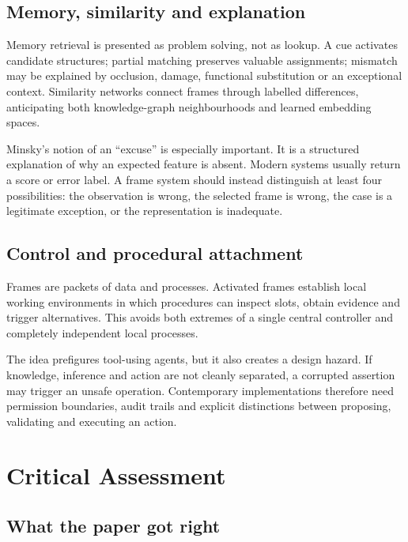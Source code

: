 \documentclass[11pt,a4paper]{article}
\begin{document}
\subsection{Memory, similarity and explanation}

Memory retrieval is presented as problem solving, not as lookup. A cue activates
candidate structures; partial matching preserves valuable assignments; mismatch
may be explained by occlusion, damage, functional substitution or an exceptional
context. Similarity networks connect frames through labelled differences,
anticipating both knowledge-graph neighbourhoods and learned embedding spaces.

Minsky's notion of an ``excuse'' is especially important. It is a structured
explanation of why an expected feature is absent. Modern systems usually return
a score or error label. A frame system should instead distinguish at least four
possibilities: the observation is wrong, the selected frame is wrong, the case
is a legitimate exception, or the representation is inadequate.

\subsection{Control and procedural attachment}

Frames are packets of data and processes. Activated frames establish local
working environments in which procedures can inspect slots, obtain evidence and
trigger alternatives. This avoids both extremes of a single central controller
and completely independent local processes.

The idea prefigures tool-using agents, but it also creates a design hazard. If
knowledge, inference and action are not cleanly separated, a corrupted assertion
may trigger an unsafe operation. Contemporary implementations therefore need
permission boundaries, audit trails and explicit distinctions between proposing,
validating and executing an action.

\section{Critical Assessment}

\subsection{What the paper got right}
\end{document}
